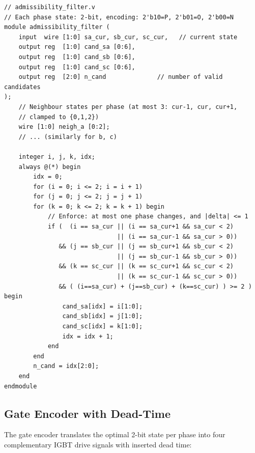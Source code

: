 \documentclass[11pt,a4paper]{article}
\begin{document}
\begin{lstlisting}[style=verilog, caption={Admissibility filter -- generates
  up to 7 candidate 3-phase state vectors.}, label={lst:admiss}]
// admissibility_filter.v
// Each phase state: 2-bit, encoding: 2'b10=P, 2'b01=O, 2'b00=N
module admissibility_filter (
    input  wire [1:0] sa_cur, sb_cur, sc_cur,   // current state
    output reg  [1:0] cand_sa [0:6],
    output reg  [1:0] cand_sb [0:6],
    output reg  [1:0] cand_sc [0:6],
    output reg  [2:0] n_cand              // number of valid candidates
);
    // Neighbour states per phase (at most 3: cur-1, cur, cur+1,
    // clamped to {0,1,2})
    wire [1:0] neigh_a [0:2];
    // ... (similarly for b, c)

    integer i, j, k, idx;
    always @(*) begin
        idx = 0;
        for (i = 0; i <= 2; i = i + 1)
        for (j = 0; j <= 2; j = j + 1)
        for (k = 0; k <= 2; k = k + 1) begin
            // Enforce: at most one phase changes, and |delta| <= 1
            if (  (i == sa_cur || (i == sa_cur+1 && sa_cur < 2)
                               || (i == sa_cur-1 && sa_cur > 0))
               && (j == sb_cur || (j == sb_cur+1 && sb_cur < 2)
                               || (j == sb_cur-1 && sb_cur > 0))
               && (k == sc_cur || (k == sc_cur+1 && sc_cur < 2)
                               || (k == sc_cur-1 && sc_cur > 0))
               && ( (i==sa_cur) + (j==sb_cur) + (k==sc_cur) ) >= 2 ) begin
                cand_sa[idx] = i[1:0];
                cand_sb[idx] = j[1:0];
                cand_sc[idx] = k[1:0];
                idx = idx + 1;
            end
        end
        n_cand = idx[2:0];
    end
endmodule
\end{lstlisting}

\subsection{Gate Encoder with Dead-Time}
\label{sec:deadtime}

The gate encoder translates the optimal 2-bit state per phase into four
complementary IGBT drive signals with inserted dead time:
\end{document}
